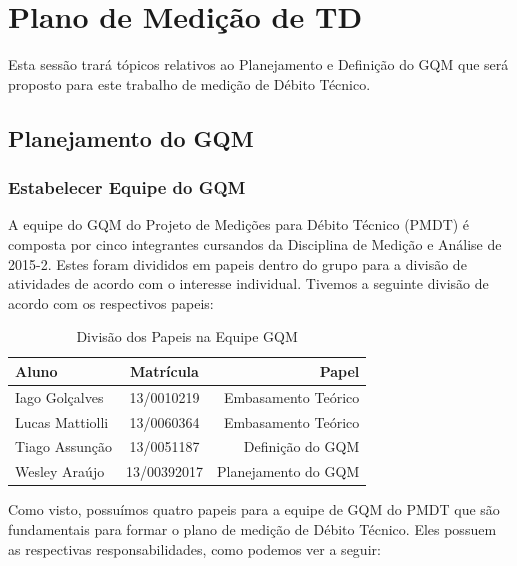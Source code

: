 \chapter[Plano de Medição de TD ]{Plano de Medição de TD }

Esta sessão trará tópicos relativos ao Planejamento e Definição do GQM que será
proposto para este trabalho de medição de Débito Técnico.

\section{Planejamento do GQM}
\subsection{Estabelecer Equipe do GQM}
A equipe do GQM do Projeto de Medições para Débito Técnico (PMDT) é composta por
cinco integrantes cursandos da Disciplina de Medição e Análise de 2015-2. Estes
foram divididos em papeis dentro do grupo para a divisão de atividades de acordo
com o interesse individual. Tivemos a seguinte divisão de acordo com os respectivos
papeis:
\\


\begin{table}[ht]
\caption{Divisão dos Papeis na Equipe GQM}
\centering
\begin{tabular}{|l*{1}{c}r|}
\hline
Aluno              & Matrícula & Papel \\
\hline
Iago Golçalves & 13/0010219 &   Embasamento Teórico   \\
\hline
Lucas Mattiolli & 13/0060364 &   Embasamento Teórico \\
\hline
Tiago Assunção & 13/0051187 &   Definição do GQM  \\
\hline
Wesley Araújo & 13/00392017 &   Planejamento do GQM \\
\hline
\end{tabular}
\label{table:papeisgqm}
\end{table}

Como visto, possuímos quatro papeis para a equipe de GQM do PMDT que são fundamentais
para formar o plano de medição de Débito Técnico. Eles possuem as respectivas
responsabilidades, como podemos ver a seguir:


